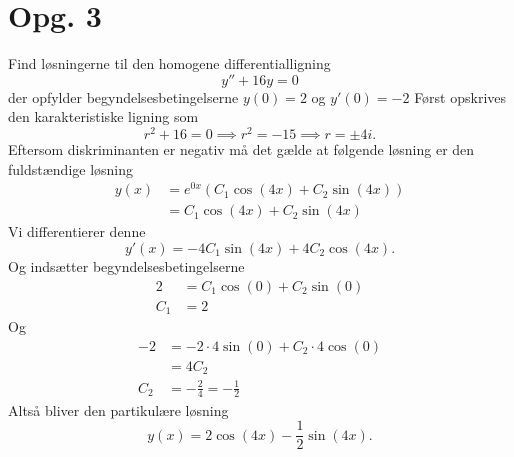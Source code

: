 \documentclass[12pt]{article}
\theoremstyle{definition}
\begin{document}
\section*{Opg. 3}
Find løsningerne til den homogene differentialligning
\[
y'' + 16y = 0
\]
der opfylder begyndelsesbetingelserne $y(0) = 2$ og $y'(0)=-2$ 
\bigbreak
Først opskrives den karakteristiske ligning som
\[
r^2 + 16 = 0 \implies r^2 = - 15 \implies r = \pm 4i 
.\]
Eftersom diskriminanten er negativ må det gælde at følgende løsning er den fuldstændige løsning
\begin{align*}
  y(x) &= e^{0x}\left( C_1 \cos \left( 4x \right) + C_2 \sin \left( 4x \right)   \right)  \\
  &= C_1 \cos \left( 4x \right) + C_2 \sin \left( 4x \right)
\end{align*}
Vi differentierer denne
\[
y'(x) = -4C_1 \sin \left( 4x \right) + 4C_2 \cos \left( 4x \right) 
.\]
Og indsætter begyndelsesbetingelserne
\begin{align*}
  2 &= C_1 \cos \left( 0 \right) + C_2 \sin \left( 0 \right)  \\
  C_1 &= 2
\end{align*}
Og
\begin{align*}
  -2 &= -2\cdot4 \sin \left( 0 \right) + C_2\cdot 4 \cos \left( 0 \right)  \\
  &= 4C_2 \\
  C_2 &= -\frac{2}{4} = -\frac{1}{2}
\end{align*}
Altså bliver den partikulære løsning
\[
y(x) = 2 \cos \left( 4x \right) - \frac{1}{2}\sin \left( 4x \right)  
.\]
\end{document}

